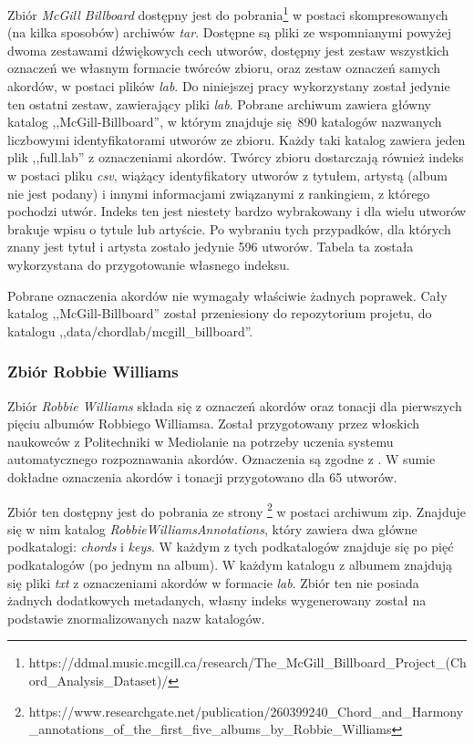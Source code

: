 Zbiór \emph{McGill Billboard} dostępny jest do
pobrania\footnote{https://ddmal.music.mcgill.ca/research/The\_McGill\_Billboard\_Project\_(Chord\_Analysis\_Dataset)/}
w postaci skompresowanych (na kilka sposobów) archiwów \emph{tar}. Dostępne są pliki ze wspomnianymi
powyżej dwoma zestawami dźwiękowych cech utworów, dostępny jest zestaw wszystkich oznaczeń we
własnym formacie twórców zbioru, oraz zestaw oznaczeń samych akordów, w postaci plików \emph{lab}.
Do niniejszej pracy wykorzystany został jedynie ten ostatni zestaw, zawierający pliki \emph{lab}. Pobrane
archiwum zawiera główny katalog ,,McGill-Billboard'', w którym znajduje się 890 katalogów nazwanych
liczbowymi identyfikatorami utworów ze zbioru. Każdy taki katalog zawiera jeden plik ,,full.lab'' z
oznaczeniami akordów. Twórcy zbioru dostarczają również indeks w postaci pliku \emph{csv}, wiążący
identyfikatory utworów z tytułem, artystą (album nie jest podany) i innymi informacjami związanymi z
rankingiem, z którego pochodzi utwór. Indeks ten jest niestety bardzo wybrakowany i dla wielu
utworów brakuje wpisu o tytule lub artyście. Po wybraniu tych przypadków, dla których znany jest
tytuł i artysta zostało jedynie 596 utworów. Tabela ta została wykorzystana do przygotowanie
własnego indeksu.

Pobrane oznaczenia akordów nie wymagały właściwie żadnych poprawek. Cały katalog
,,McGill-Billboard'' został przeniesiony do repozytorium projetu, do katalogu
,,data/chordlab/mcgill\_billboard''.

\subsubsection{Zbiór Robbie Williams}

Zbiór \emph{Robbie Williams} \cite{giorgi_automatic_2013} składa się z oznaczeń akordów oraz tonacji
dla pierwszych pięciu albumów Robbiego Williamsa. Został przygotowany przez włoskich naukowców z
Politechniki w Mediolanie na potrzeby uczenia systemu automatycznego rozpoznawania akordów.
Oznaczenia są zgodne z \cite{harte_towards_nodate}. W sumie dokładne oznaczenia akordów i tonacji
przygotowano dla 65 utworów.

Zbiór ten dostępny jest do pobrania ze strony
\footnote{https://www.researchgate.net/publication/260399240_Chord_and_Harmony_annotations_of_the_first_five_albums_by_Robbie_Williams}
w postaci archiwum zip. Znajduje się w nim katalog \emph{RobbieWilliamsAnnotations}, który zawiera
dwa główne podkatalogi: \emph{chords} i \emph{keys}. W każdym z tych podkatalogów znajduje się po pięć
podkatalogów (po jednym na album). W każdym katalogu z albumem znajdują się pliki \emph{txt} z
oznaczeniami akordów w formacie \emph{lab}. Zbiór ten nie posiada żadnych dodatkowych metadanych,
własny indeks wygenerowany został na podstawie znormalizowanych nazw katalogów.

